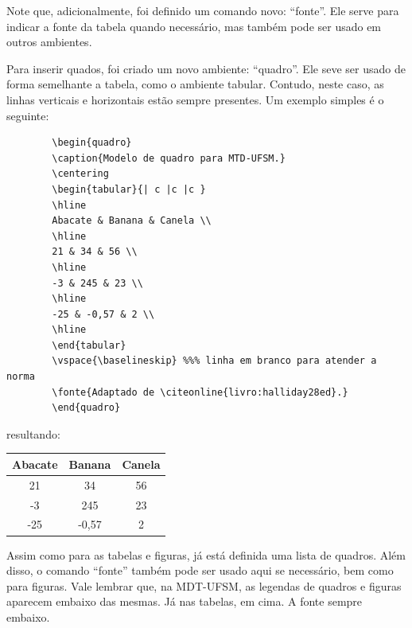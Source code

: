 \documentclass[oneside,openright,12pt]{ufsm_2015} %
\begin{document}
         \par Note que, adicionalmente, foi definido um comando novo: ``fonte''. Ele serve para indicar a fonte da tabela quando necessário, mas também pode ser usado em outros ambientes.
         
         \par Para inserir quados, foi criado um novo ambiente: ``quadro''. Ele seve ser usado de forma semelhante a tabela, como o ambiente tabular. Contudo, neste caso, as linhas verticais e horizontais estão sempre presentes. Um exemplo simples é o seguinte: 
         
         
         \begin{verbatim}
	    \begin{quadro}
   	    \caption{Modelo de quadro para MTD-UFSM.}
	    \centering
	    \begin{tabular}{| c |c |c }
	    \hline
	    Abacate & Banana & Canela \\
	    \hline
	    21 & 34 & 56 \\
	    \hline
	    -3 & 245 & 23 \\
	    \hline
	    -25 & -0,57 & 2 \\
	    \hline
	    \end{tabular}
	    \vspace{\baselineskip} %%% linha em branco para atender a norma
	    \fonte{Adaptado de \citeonline{livro:halliday28ed}.}
	    \end{quadro}
         \end{verbatim}
         
         \noindent resultando:
         
	    \begin{quadro}
	    \caption{Modelo de quadro para MTD-UFSM.}
	    \centering
	    \begin{tabular}{| c |c |c |}
	    \hline
	    Abacate & Banana & Canela \\
	    \hline
	    21 & 34 & 56 \\
	    \hline
	    -3 & 245 & 23 \\
	    \hline
	    -25 & -0,57 & 2 \\
	    \hline
	    \end{tabular}
	    \vspace{\baselineskip} %
	    \end{quadro}
	    

         \noindent Assim como para as tabelas e figuras, já está definida uma lista de quadros. Além disso, o comando ``fonte'' também pode ser usado aqui se necessário, bem como para figuras. Vale lembrar que, na MDT-UFSM, as legendas de quadros e figuras aparecem embaixo das mesmas. Já nas tabelas, em cima. A fonte sempre embaixo.
         
\end{document}

